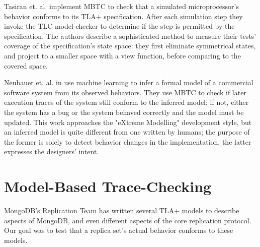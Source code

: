 \documentclass{vldb}
\begin{document}
Tasiran et. al. \cite{Tasiran03AlphaMicroprocessor} implement MBTC to check that a simulated microprocessor's behavior conforms to its TLA+ specification.
After each simulation step they invoke the TLC model-checker to determine if the step is permitted by the specification.
The authors describe a sophisticated method to measure their tests' coverage of the specification's state space: they first eliminate symmetrical states, and project to a smaller space with a view function, before comparing to the covered space.

Neubauer et. al. in \cite{Neubauer12AutomatedContinuousQualityAssurance} use machine learning to infer a formal model of a commercial software system from its observed behaviors.
They use MBTC to check if later execution traces of the system still conform to the inferred model; if not, either the system has a bug or the system behaved correctly and the model must be updated.
This work approaches the "eXtreme Modelling" development style, but an inferred model is quite different from one written by humans; the purpose of the former is solely to detect behavior changes in the implementation, the latter expresses the designers' intent.

\section{Model-Based Trace-Checking}
\label{sec:model_based_trace_checking}



MongoDB's Replication Team has written several TLA+ models to describe aspects of MongoDB, and even different aspects of the core replication protocol. 
Our goal was to test that a replica set's actual behavior conforms to these models.
\end{document}
